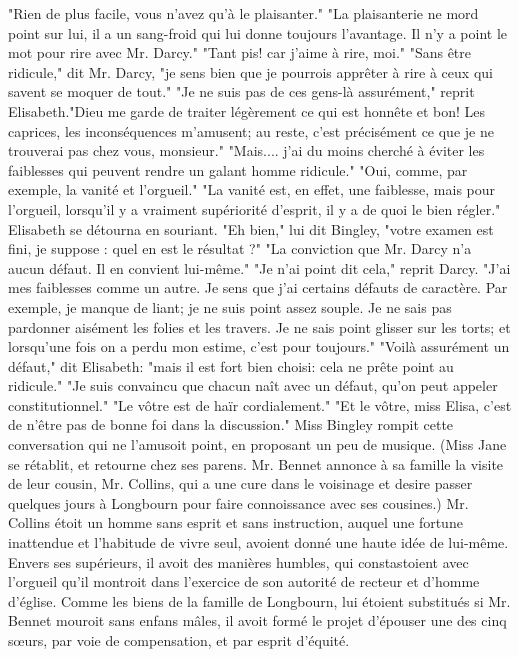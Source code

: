 "Rien de plus facile, vous n'avez qu'à le plaisanter."
"La plaisanterie ne mord point sur lui, il a un sang-froid qui lui donne toujours l'avantage. Il n'y a point le mot pour rire avec Mr. Darcy."
"Tant pis! car j'aime à rire, moi."
"Sans être ridicule," dit Mr. Darcy, "je sens bien que je pourrois apprêter à rire à ceux qui savent se moquer de tout."
"Je ne suis pas de ces gens-là assurément," reprit Elisabeth."Dieu me garde de traiter légèrement ce qui est honnête et bon! Les caprices, les inconséquences m'amusent; au reste, c'est précisément ce que je ne trouverai pas chez vous, monsieur."
\setcounter{page}{398}
"Mais.... j'ai du moins cherché à éviter les faiblesses qui peuvent rendre un galant homme ridicule."
"Oui, comme, par exemple, la vanité et l'orgueil."
"La vanité est, en effet, une faiblesse, mais pour l'orgueil, lorsqu'il y a vraiment supériorité d'esprit, il y a de quoi le bien régler."
Elisabeth se détourna en souriant.
"Eh bien," lui dit Bingley, "votre examen est fini, je suppose : quel en est le résultat ?"
"La conviction que Mr. Darcy n'a aucun défaut. Il en convient lui-même."
"Je n'ai point dit cela," reprit Darcy. "J'ai mes faiblesses comme un autre. Je sens que j'ai certains défauts de caractère. Par exemple, je manque de liant; je ne suis point assez souple. Je ne sais pas pardonner aisément les folies et les travers. Je ne sais point glisser sur les torts; et lorsqu'une fois on a perdu mon estime, c'est pour toujours."
"Voilà assurément un défaut," dit Elisabeth: "mais il est fort bien choisi: cela ne prête point au ridicule."
"Je suis convaincu que chacun naît avec un défaut, qu'on peut appeler constitutionnel."
\setcounter{page}{399} 
"Le vôtre est de haïr cordialement."
"Et le vôtre, miss Elisa, c'est de n'être pas de bonne foi dans la discussion."
Miss Bingley rompit cette conversation qui ne l'amusoit point, en proposant un peu de musique.
(Miss Jane se rétablit, et retourne chez ses parens. Mr. Bennet annonce à sa famille la visite de leur cousin, Mr. Collins, qui a une cure dans le voisinage et desire passer quelques jours à Longbourn pour faire connoissance avec ses cousines.)
Mr. Collins étoit un homme sans esprit et sans instruction, auquel une fortune inattendue et l'habitude de vivre seul, avoient donné une haute idée de lui-même. Envers ses supérieurs, il avoit des manières humbles, qui constastoient avec l'orgueil qu'il montroit dans l'exercice de son autorité de recteur et d'homme d'église. Comme les biens de la famille de Longbourn, lui étoient substitués si Mr. Bennet mouroit sans enfans mâles, il avoit formé le projet d'épouser une des cinq sœurs, par voie de compensation, et par esprit d'équité.
